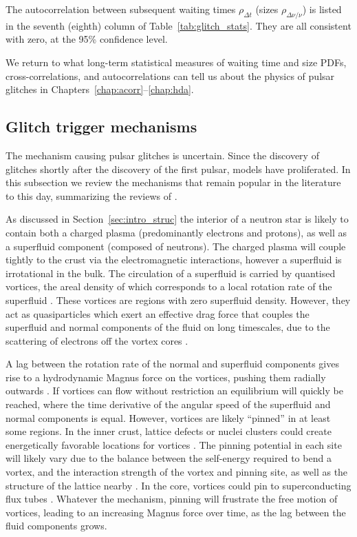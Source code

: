 The autocorrelation between subsequent waiting times $\rho_{\Delta t}$ (sizes $\rho_{\Delta \nu / \nu}$) is listed in the seventh (eighth) column of Table~\ref{tab:glitch_stats}. They are all consistent with zero, at the 95\% confidence level. 

We return to what long-term statistical measures of waiting time and size PDFs, cross-correlations, and autocorrelations can tell us about the physics of pulsar glitches in Chapters~\ref{chap:acorr}--\ref{chap:hda}.

\subsection{Glitch trigger mechanisms} \label{sec:glitch_trigger}
The mechanism causing pulsar glitches is uncertain. Since the discovery of glitches shortly after the discovery of the first pulsar, models have proliferated. In this subsection we review the mechanisms that remain popular in the literature to this day, summarizing the reviews of \citet{Haskell2015,Antonopoulou2022,Antonelli2022,Zhou2022}. 

As discussed in Section~\ref{sec:intro_struc} the interior of a neutron star is likely to contain both a charged plasma (predominantly electrons and protons), as well as a superfluid component (composed of neutrons). The charged plasma will couple tightly to the crust via the electromagnetic interactions, however a superfluid is irrotational in the bulk. The circulation of a superfluid is carried by quantised vortices, the areal density of which corresponds to a local rotation rate of the superfluid \citep{Onsager1949,Migdal1959}. These vortices are regions with zero superfluid density. However, they act as quasiparticles which exert an effective drag force that couples the superfluid and normal components of the fluid on long timescales, due to the scattering of electrons off the vortex cores \citep{Hall1956, Mendell1991}.

A lag between the rotation rate of the normal and superfluid components gives rise to a hydrodynamic Magnus force on the vortices, pushing them radially outwards \citep{Glampedakis2011}. If vortices can flow without restriction an equilibrium will quickly be reached, where the time derivative of the angular speed of the superfluid and normal components is equal. However, vortices are likely ``pinned'' in at least some regions. In the inner crust, lattice defects or nuclei clusters could create energetically favorable locations for vortices \citep{Anderson1975,Alpar1977,Epstein1988,Link1991,Pizzochero1997,Donati2006,Avogadro2007,Link2009a,Seveso2016a}. The pinning potential in each site will likely vary due to the balance between the self-energy required to bend a vortex, and the interaction strength of the vortex and pinning site, as well as the structure of the lattice nearby \citep{Link2022}. In the core, vortices could pin to superconducting flux tubes \citep{Migdal1959,Ruderman1998,Glampedakis2011,Gugercinoglu2014}. Whatever the mechanism, pinning will frustrate the free motion of vortices, leading to an increasing Magnus force over time, as the lag between the fluid components grows. 

